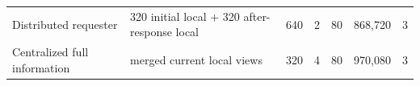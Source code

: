 \begin{tabularx}{\textwidth}{@{}Z Z r r r r r@{}}
  \toprule
   &  &  &  &  &  &  \\
  \midrule
  Distributed requester & 320 initial local + 320 after-response local & 640 & 2 & 80 & 868,720 & 3 \\
  Centralized full information & merged current local views & 320 & 4 & 80 & 970,080 & 3 \\
  \bottomrule
\end{tabularx}
